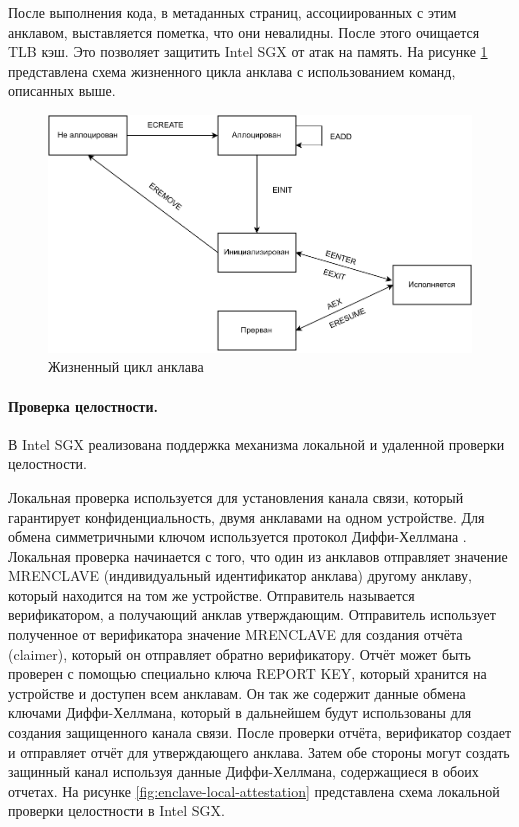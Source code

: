 После выполнения кода, в метаданных страниц, ассоциированных с этим анклавом, выставляется пометка, что они невалидны. После этого очищается TLB кэш. Это позволяет защитить Intel SGX от атак на память. На рисунке \ref{fig:enclave-life} представлена схема жизненного цикла анклава с использованием команд, описанных выше.

\begin{figure}[h]
	\centering
	\includegraphics[width=\textwidth]{img/enclave-life-cycle.pdf}
	\caption{Жизненный цикл анклава}
	\label{fig:enclave-life}
\end{figure}

\paragraph{Проверка целостности.}

В Intel SGX реализована поддержка механизма локальной и удаленной  проверки целостности. 

Локальная проверка используется для установления канала связи, который гарантирует конфиденциальность, двумя анклавами на одном устройстве. Для обмена симметричными ключом используется протокол  Диффи-Хеллмана \cite{dh-ke}. Локальная проверка начинается с того, что один из анклавов отправляет значение MRENCLAVE (индивидуальный идентификатор анклава) другому анклаву, который находится на том же устройстве. Отправитель называется верификатором, а получающий анклав утверждающим. Отправитель использует полученное от верификатора значение MRENCLAVE для создания отчёта (claimer), который он отправляет обратно верификатору. Отчёт может быть проверен с помощью специально ключа REPORT KEY, который хранится на устройстве и доступен всем анклавам. Он так же содержит данные обмена ключами Диффи-Хеллмана, который в дальнейшем будут использованы для создания защищенного канала связи. После проверки отчёта, верификатор создает и отправляет отчёт для утверждающего анклава. Затем обе стороны могут создать защинный канал используя данные Диффи-Хеллмана, содержащиеся в обоих отчетах. На рисунке \ref{fig:enclave-local-attestation} представлена схема локальной проверки целостности в Intel SGX.

